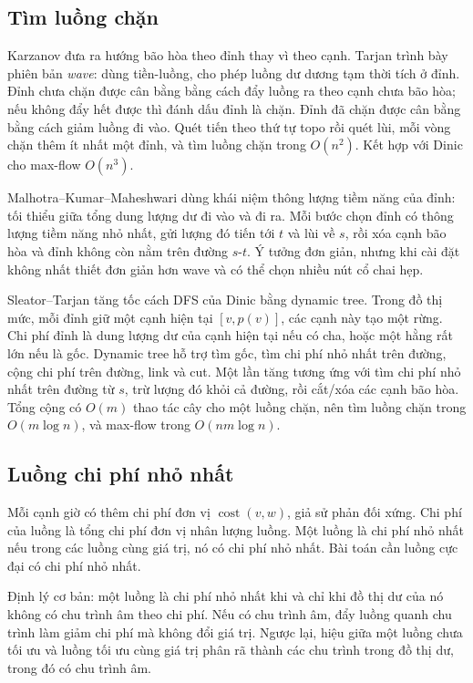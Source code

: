 \documentclass[11pt]{article}
\begin{document}
\subsection*{Tìm luồng chặn}

Karzanov đưa ra hướng bão hòa theo đỉnh thay vì theo cạnh. Tarjan trình bày
phiên bản \emph{wave}: dùng tiền-luồng, cho phép luồng dư dương tạm thời tích ở
đỉnh. Đỉnh chưa chặn được cân bằng bằng cách đẩy luồng ra theo cạnh chưa bão
hòa; nếu không đẩy hết được thì đánh dấu đỉnh là chặn. Đỉnh đã chặn được cân
bằng bằng cách giảm luồng đi vào. Quét tiến theo thứ tự topo rồi quét lùi, mỗi
vòng chặn thêm ít nhất một đỉnh, và tìm luồng chặn trong \(O(n^2)\). Kết hợp với
Dinic cho max-flow \(O(n^3)\).

Malhotra--Kumar--Maheshwari dùng khái niệm thông lượng tiềm năng của đỉnh:
tối thiểu giữa tổng dung lượng dư đi vào và đi ra. Mỗi bước chọn đỉnh có thông
lượng tiềm năng nhỏ nhất, gửi lượng đó tiến tới \(t\) và lùi về \(s\), rồi xóa
cạnh bão hòa và đỉnh không còn nằm trên đường \(s\)-\(t\). Ý tưởng đơn giản,
nhưng khi cài đặt không nhất thiết đơn giản hơn wave và có thể chọn nhiều nút cổ
chai hẹp.

Sleator--Tarjan tăng tốc cách DFS của Dinic bằng dynamic tree. Trong đồ thị mức,
mỗi đỉnh giữ một cạnh hiện tại \([v,p(v)]\), các cạnh này tạo một rừng. Chi phí
đỉnh là dung lượng dư của cạnh hiện tại nếu có cha, hoặc một hằng rất lớn nếu là
gốc. Dynamic tree hỗ trợ tìm gốc, tìm chi phí nhỏ nhất trên đường, cộng chi phí
trên đường, link và cut. Một lần tăng tương ứng với tìm chi phí nhỏ nhất trên
đường từ \(s\), trừ lượng đó khỏi cả đường, rồi cắt/xóa các cạnh bão hòa. Tổng
cộng có \(O(m)\) thao tác cây cho một luồng chặn, nên tìm luồng chặn trong
\(O(m\log n)\), và max-flow trong \(O(nm\log n)\).

\subsection*{Luồng chi phí nhỏ nhất}

Mỗi cạnh giờ có thêm chi phí đơn vị \(\operatorname{cost}(v,w)\), giả sử phản
đối xứng. Chi phí của luồng là tổng chi phí đơn vị nhân lượng luồng. Một luồng
là chi phí nhỏ nhất nếu trong các luồng cùng giá trị, nó có chi phí nhỏ nhất.
Bài toán cần luồng cực đại có chi phí nhỏ nhất.

Định lý cơ bản: một luồng là chi phí nhỏ nhất khi và chỉ khi đồ thị dư của nó
không có chu trình âm theo chi phí. Nếu có chu trình âm, đẩy luồng quanh chu
trình làm giảm chi phí mà không đổi giá trị. Ngược lại, hiệu giữa một luồng chưa
tối ưu và luồng tối ưu cùng giá trị phân rã thành các chu trình trong đồ thị dư,
trong đó có chu trình âm.
\end{document}
